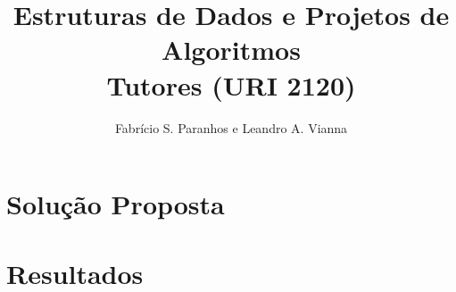 \documentclass[12pt]{article}
\title{Estruturas de Dados e Projetos de Algoritmos\\Tutores (URI 2120)}
\author{Fabrício S. Paranhos\inst{1} e Leandro A. Vianna\inst{1}}
\begin{document}
 

\maketitle

     


\section{Solução Proposta}

\section{Resultados} \label{sec:res}







\end{document}
